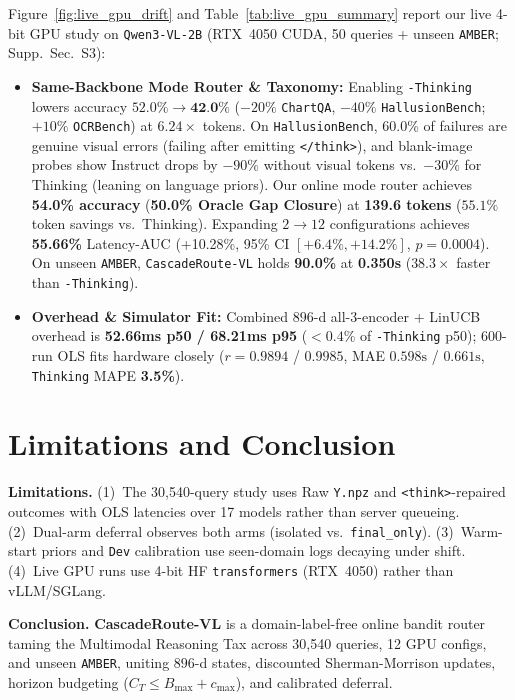 \documentclass[10pt,twocolumn,letterpaper]{article}
\begin{document}
Figure~\ref{fig:live_gpu_drift} and Table~\ref{tab:live_gpu_summary} report our live 4-bit GPU study on \texttt{Qwen3-VL-2B} (RTX~4050 CUDA, 50 queries + unseen \texttt{AMBER}; Supp.\ Sec.~S3):
\begin{itemize}
    \item \textbf{Same-Backbone Mode Router \& Taxonomy:} Enabling \texttt{-Thinking} lowers accuracy $52.0\% \to \textbf{42.0\%}$ ($-20\%$ \texttt{ChartQA}, $-40\%$ \texttt{HallusionBench}; $+10\%$ \texttt{OCRBench}) at $6.24\times$ tokens. On \texttt{HallusionBench}, 60.0\% of failures are genuine visual errors (failing after emitting \texttt{</think>}), and blank-image probes show Instruct drops by $-90\%$ without visual tokens vs.\ $-30\%$ for Thinking (leaning on language priors). Our online mode router achieves \textbf{54.0\% accuracy} (\textbf{50.0\% Oracle Gap Closure}) at \textbf{139.6 tokens} ($55.1\%$ token savings vs.\ Thinking). Expanding $2 \to 12$ configurations achieves \textbf{55.66\%} Latency-AUC (+10.28\%, 95\% CI $[+6.4\%, +14.2\%]$, $p{=}0.0004$). On unseen \texttt{AMBER}, \texttt{CascadeRoute-VL} holds \textbf{90.0\%} at \textbf{0.350s} ($38.3\times$ faster than \texttt{-Thinking}).
    \item \textbf{Overhead \& Simulator Fit:} Combined $896$-d all-3-encoder + LinUCB overhead is \textbf{52.66ms p50 / 68.21ms p95} ($<0.4\%$ of \texttt{-Thinking} p50); 600-run OLS fits hardware closely ($r{=}0.9894$ / $0.9985$, MAE $0.598\text{s}$ / $0.661\text{s}$, \texttt{Thinking} MAPE \textbf{3.5\%}).
\end{itemize}

\section{Limitations and Conclusion}
\label{sec:conclusion}

\textbf{Limitations.} (1)~The 30,540-query study uses Raw \texttt{Y.npz} and \texttt{<think>}-repaired outcomes with OLS latencies over 17 models rather than server queueing. (2)~Dual-arm deferral observes both arms (isolated vs.\ \texttt{final\_only}). (3)~Warm-start priors and \texttt{Dev} calibration use seen-domain logs decaying under shift. (4)~Live GPU runs use 4-bit HF \texttt{transformers} (RTX~4050) rather than vLLM/SGLang.

\textbf{Conclusion.} \textbf{CascadeRoute-VL} is a domain-label-free online bandit router taming the Multimodal Reasoning Tax across 30,540 queries, 12 GPU configs, and unseen \texttt{AMBER}, uniting $896$-d states, discounted Sherman-Morrison updates, horizon budgeting ($C_T {\le} B_{\max}{+}c_{\max}$), and calibrated deferral.

\clearpage
{\small


}
\end{document}
